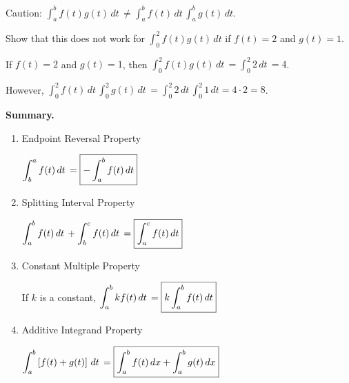 \documentclass[main]{subfiles}
\begin{document}
\begin{enumerate}
\begin{enumerate}[topsep=0pt]
    \begin{problem}[\vfill]
        Caution: $\displaystyle \int_a^b f(t)g(t)\,dt\, \neq
        \int_a^b f(t)\,dt\, \int_a^b g(t)\,dt$. 
        
        Show that this does not work
        for $\displaystyle \int_0^2 f(t)g(t)\,dt$ if $f(t)=2$ and $g(t)=1$.
    \end{problem}

    \begin{solution}
        If $f(t)=2$ and $g(t)=1$, then 
        $\displaystyle\int_0^2 f(t)g(t)\,dt\, = \int_0^2 2\,dt\,=4$.
        
        However, 
        $\displaystyle\int_0^2 f(t)\,dt\, \int_0^2 g(t)\,dt\, =
        \int_0^2 2\,dt\, \int_0^2 1\,dt = 4\cdot 2 = 8$.
    \end{solution}

  \end{enumerate}

\end{enumerate}

\begin{framed}
  \textbf{Summary.}
  \begin{enumerate}[topsep=0pt,label=\arabic*.]
  \item Endpoint Reversal Property

    $\displaystyle \int_b^a f(t)\,dt\, = \boxed{-\int_a^b f(t)\,dt}$

  \item Splitting Interval Property
  
    $\displaystyle \int_a^b f(t)\,dt\, + \int_b^c f(t)\,dt\, = \boxed{
        \int_a^c f(t)\,dt }$

  \item Constant Multiple Property
  
    If $k$ is a constant, $\displaystyle \int_a^b k f(t)\,dt\, =
    \boxed{k \int_a^b f(t)\,dt}$

  \item Additive Integrand Property
  
    $\displaystyle \int_a^b \left[f(t) + g(t)\right]\,dt\, 
    = \boxed{\int_a^b
        f(t)\,dx +\int_a^b g(t)\,dx}$
  \end{enumerate}
\end{framed}

\pspace{\newpage}
\end{document}
